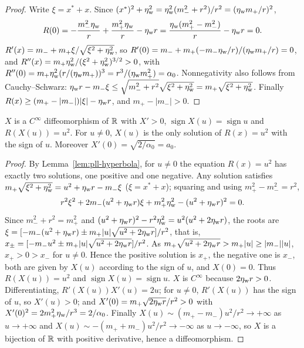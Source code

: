 \begin{proof}
Write $\xi=x^*+x$. Since $(x^*)^2+\eta_{\rm w}^2=\eta_{\rm w}^2(m_-^2+r^2)/r^2=(\eta_{\rm w} m_+/r)^2$,
\[
 R(0)=-\frac{m_-^2\eta_{\rm w}}{r}+\frac{m_+^2\eta_{\rm w}}{r}-\eta_{\rm w} r=\frac{\eta_{\rm w}(m_+^2-m_-^2)}{r}-\eta_{\rm w} r=0 .
\]
$R'(x)=m_-+m_+\xi/\sqrt{\xi^2+\eta_{\rm w}^2}$, so $R'(0)=m_-+m_+(-m_-\eta_{\rm w}/r)/(\eta_{\rm w} m_+/r)=0$, and
$R''(x)=m_+\eta_{\rm w}^2/(\xi^2+\eta_{\rm w}^2)^{3/2}>0$, with $R''(0)=m_+\eta_{\rm w}^2(r/(\eta_{\rm w} m_+))^3=r^3/(\eta_{\rm w} m_+^2)=\alpha_0$.
Nonnegativity also follows from Cauchy--Schwarz:
$\eta_{\rm w} r-m_-\xi\le\sqrt{m_-^2+r^2}\sqrt{\xi^2+\eta_{\rm w}^2}=m_+\sqrt{\xi^2+\eta_{\rm w}^2}$. Finally
$R(x)\ge(m_+-|m_-|)|\xi|-\eta_{\rm w} r$, and $m_+-|m_-|>0$.
\end{proof}

\begin{lemma}[$X$ inverts $R$]\label{lem:pll-hyperbola-inverse}
$X$ is a $C^\infty$ diffeomorphism of $\mathbb{R}$ with $X'>0$, $\operatorname{sign}X(u)=\operatorname{sign}u$ and
$R(X(u))=u^2$. For $u\ne0$, $X(u)$ is the only solution of $R(x)=u^2$ with the sign of $u$. Moreover
$X'(0)=\sqrt{2/\alpha_0}=a_0$.
\end{lemma}

\begin{proof}
By Lemma~\ref{lem:pll-hyperbola}, for $u\ne0$ the equation $R(x)=u^2$ has exactly two solutions, one positive and
one negative. Any solution satisfies $m_+\sqrt{\xi^2+\eta_{\rm w}^2}=u^2+\eta_{\rm w} r-m_-\xi$ ($\xi=x^*+x$); squaring and using
$m_+^2-m_-^2=r^2$,
\[
 r^2\xi^2+2m_-(u^2+\eta_{\rm w} r)\xi+m_+^2\eta_{\rm w}^2-(u^2+\eta_{\rm w} r)^2=0 .
\]
Since $m_-^2+r^2=m_+^2$ and $(u^2+\eta_{\rm w} r)^2-r^2\eta_{\rm w}^2=u^2(u^2+2\eta_{\rm w} r)$, the roots are
$\xi=[-m_-(u^2+\eta_{\rm w} r)\pm m_+|u|\sqrt{u^2+2\eta_{\rm w} r}]/r^2$, that is,
$x_\pm=[-m_-u^2\pm m_+|u|\sqrt{u^2+2\eta_{\rm w} r}]/r^2$. As $m_+\sqrt{u^2+2\eta_{\rm w} r}>m_+|u|\ge|m_-||u|$, $x_+>0>x_-$ for
$u\ne0$. Hence the positive solution is $x_+$, the negative one is $x_-$, both are given by $X(u)$ according to the
sign of $u$, and $X(0)=0$. Thus $R(X(u))=u^2$ and $\operatorname{sign}X(u)=\operatorname{sign}u$. $X$ is $C^\infty$
because $2\eta_{\rm w} r>0$. Differentiating, $R'(X(u))X'(u)=2u$; for $u\ne0$, $R'(X(u))$ has the sign of $u$, so
$X'(u)>0$; and $X'(0)=m_+\sqrt{2\eta_{\rm w} r}/r^2>0$ with $X'(0)^2=2m_+^2\eta_{\rm w}/r^3=2/\alpha_0$. Finally
$X(u)\sim(m_+-m_-)u^2/r^2\to+\infty$ as $u\to+\infty$ and $X(u)\sim-(m_++m_-)u^2/r^2\to-\infty$ as $u\to-\infty$, so
$X$ is a bijection of $\mathbb{R}$ with positive derivative, hence a diffeomorphism.
\end{proof}


